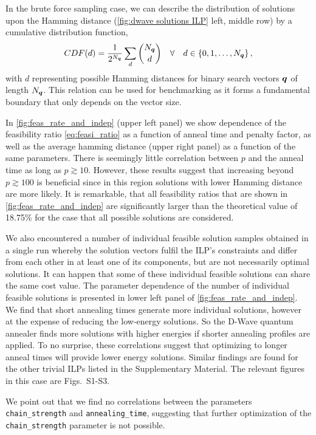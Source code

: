 \documentclass[utf8, nocrop]{FrontiersinHarvardArxiv}
\def\ve#1{\mathlette{\boldmath}{#1}}
\def\mathlette#1#2{{\mathchoice{\mbox{#1$\displaystyle #2$}}%
        {\mbox{#1$\textstyle #2$}}%
        {\mbox{#1$\scriptstyle #2$}}%
        {\mbox{#1$\scriptscriptstyle #2$}}}}
\begin{document}
In the brute force sampling case, we can describe the distribution of solutions upon the Hamming distance (\autoref{fig:dwave solutions ILP} left, middle row) by a cumulative distribution function,  
\begin{equation}
    CDF(d) = \frac{1}{2^{N_{\ve q}}}\sum_d \binom{N_{\ve q} }{d} \quad\forall\quad d \in \{0, 1, \ldots, N_{\ve q}\}\,,
\end{equation}
with $d$ representing possible Hamming distances for binary search vectors $\ve q$ of length $N_{\ve q}$. This relation can be used for benchmarking as it forms a fundamental boundary that only depends on the vector size.

In \autoref{fig:feas_rate_and_indep} (upper left panel) we show dependence of the feasibility ratio \eqref{eq:feasi_ratio}
as a function of anneal time and penalty factor, as well as the average hamming distance (upper right panel) as a function of the same parameters. 
There is seemingly little correlation between $p$ and the anneal time as long as $p\gtrsim10$.
However, these results suggest that increasing beyond $p\gtrsim 100$ is beneficial since in this region  solutions with lower Hamming distance are more likely. It is remarkable, that all feasibility ratios that are shown in \autoref{fig:feas_rate_and_indep} are significantly larger than the theoretical value of 18.75\% for the case that all possible solutions are considered.



We also encountered a number of individual feasible solution samples obtained in a single run whereby the solution vectors fulfil the ILP's constraints and differ from each other in at least one of its components, but are not necessarily optimal solutions. It can happen that some of these individual feasible solutions can share the same cost value.
The parameter dependence of the number of individual feasible solutions is presented in lower left panel of \autoref{fig:feas_rate_and_indep}. 
We find that short annealing times generate more individual solutions, however at the expense of reducing the low-energy solutions.
So the D-Wave quantum annealer finds more solutions with higher energies if shorter annealing profiles are applied. To no surprise, these correlations suggest that optimizing to longer anneal times will provide lower energy solutions. 
Similar findings are found for the other trivial ILPs listed in the Supplementary Material.
The relevant figures in this case are Figs.~S1-S3.

We point out that we find no correlations between the parameters \texttt{chain\_strength} and \texttt{annealing\_time}, suggesting that further optimization of the \texttt{chain\_strength} parameter is not possible.
\end{document}
